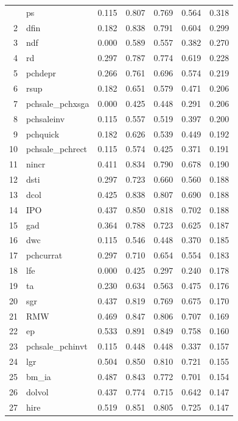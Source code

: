 \begin{footnotesize}
\begin{longtable}{rl|c|c|c|c|c}
		\hline
		\hline
		\endfoot
		1 & ps & 0.115 & 0.807 & 0.769 & 0.564 & 0.318 \\ 
		2 & dfin & 0.182 & 0.838 & 0.791 & 0.604 & 0.299 \\ 
		3 & ndf & 0.000 & 0.589 & 0.557 & 0.382 & 0.270 \\ 
		4 & rd & 0.297 & 0.787 & 0.774 & 0.619 & 0.228 \\ 
		5 & pchdepr & 0.266 & 0.761 & 0.696 & 0.574 & 0.219 \\ 
		6 & rsup & 0.182 & 0.651 & 0.579 & 0.471 & 0.206 \\ 
		7 & pchsale\_pchxsga & 0.000 & 0.425 & 0.448 & 0.291 & 0.206 \\ 
		8 & pchsaleinv & 0.115 & 0.557 & 0.519 & 0.397 & 0.200 \\ 
		9 & pchquick & 0.182 & 0.626 & 0.539 & 0.449 & 0.192 \\ 
		10 & pchsale\_pchrect & 0.115 & 0.574 & 0.425 & 0.371 & 0.191 \\ 
		11 & nincr & 0.411 & 0.834 & 0.790 & 0.678 & 0.190 \\ 
		12 & dsti & 0.297 & 0.723 & 0.660 & 0.560 & 0.188 \\ 
		13 & dcol & 0.425 & 0.838 & 0.807 & 0.690 & 0.188 \\ 
		14 & IPO & 0.437 & 0.850 & 0.818 & 0.702 & 0.188 \\ 
		15 & gad & 0.364 & 0.788 & 0.723 & 0.625 & 0.187 \\ 
		16 & dwc & 0.115 & 0.546 & 0.448 & 0.370 & 0.185 \\ 
		17 & pchcurrat & 0.297 & 0.710 & 0.654 & 0.554 & 0.183 \\ 
		18 & lfe & 0.000 & 0.425 & 0.297 & 0.240 & 0.178 \\ 
		19 & ta & 0.230 & 0.634 & 0.563 & 0.475 & 0.176 \\ 
		20 & sgr & 0.437 & 0.819 & 0.769 & 0.675 & 0.170 \\ 
		21 & RMW & 0.469 & 0.847 & 0.806 & 0.707 & 0.169 \\ 
		22 & ep & 0.533 & 0.891 & 0.849 & 0.758 & 0.160 \\ 
		23 & pchsale\_pchinvt & 0.115 & 0.448 & 0.448 & 0.337 & 0.157 \\ 
		24 & lgr & 0.504 & 0.850 & 0.810 & 0.721 & 0.155 \\ 
		25 & bm\_ia & 0.487 & 0.843 & 0.772 & 0.701 & 0.154 \\ 
		26 & dolvol & 0.437 & 0.774 & 0.715 & 0.642 & 0.147 \\ 
		27 & hire & 0.519 & 0.851 & 0.805 & 0.725 & 0.147 \\ 

\end{longtable}
\end{footnotesize}
